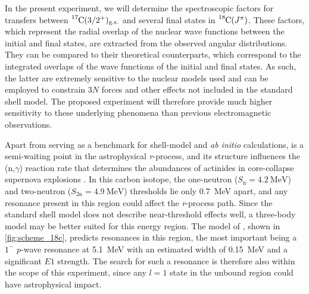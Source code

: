 \documentclass[a4paper, 10pt]{article}
\newcommand{\iso}[2]{\ce{^{#1}#2}}
\newcommand{\ex}{\ensuremath{E_{\text{x}}}\xspace}
\newcommand{\sn}{\ensuremath{S_{\text{n}}}\xspace}
\newcommand{\stwon}{\ensuremath{S_{\text{2n}}}\xspace}
\begin{document}


In the present experiment, we will determine the spectroscopic factors for transfers between $\iso{17}{C}(3/2^+)_{\text{g.s.}}$ and several final states in $\iso{18}{C}(J^{\pi})$. These factors, which represent the radial overlap of the nuclear wave functions between the initial and final states, are extracted from the observed angular distributions. They can be compared to their theoretical counterparts, which correspond to the integrated overlaps of the wave functions of the initial and final states. As such, the latter are extremely sensitive to the nuclear models used and can be employed to constrain $3N$ forces and other effects not included in the standard shell model. The proposed experiment will therefore provide much higher sensitivity to these underlying phenomena than previous electromagnetic observations.

Apart from serving as a benchmark for shell-model and \textit{ab initio} calculations, \iso{18}{C} is a semi-waiting point in the astrophysical \textit{r}-process, and its structure influences the \iso{17}{C}(n,$\gamma$) reaction rate that determines the abundances of actinides in core-collapse supernova explosions \cite{sasaqui2005}. In this carbon isotope, the one-neutron ($\sn = \qty{4.2}{\MeV}$) and two-neutron ($\stwon = \qty{4.9}{\MeV}$) thresholds lie only \qty{0.7}{\MeV} apart, and any resonance present in this region could affect the \textit{r}-process path. Since the standard shell model does not describe near-threshold effects well, a three-body model may be better suited for this energy region. The model of \cite{yakhelef2010}, shown in \autoref{fig:scheme_18c}, predicts resonances in this region, the most important being a $1^-$ $p$-wave resonance at \qty{5.1}{\MeV} with an estimated width of \qty{0.15}{\MeV} and a significant $E1$ strength. The search for such a resonance is therefore also within the scope of this experiment, since any $l=1$ state in the unbound region could have astrophysical impact.
\end{document}
